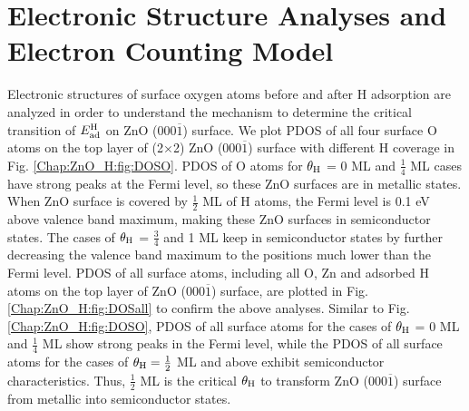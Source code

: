 \section{Electronic Structure Analyses and Electron Counting Model}

Electronic structures of surface oxygen atoms before and after H adsorption are analyzed in order to understand the mechanism to determine the critical transition of $E_{\textup{ad}}^{\textup{H}}$ on ZnO (000$\overline{1}$) surface. We plot \ac{PDOS} of all four surface O atoms on the top layer of (2$\times$2) ZnO (000$\overline{1}$) surface with different H coverage in Fig. \ref{Chap:ZnO_H:fig:DOSO}. \ac{PDOS} of O atoms for $\theta_{\textup{H}}$ = 0 ML and $\frac{1}{4}$ ML cases have strong peaks at the Fermi level, so these ZnO surfaces are in metallic states. When ZnO surface is covered by $\frac{1}{2}$ ML of H atoms, the Fermi level is 0.1 eV above valence band maximum, making these ZnO surfaces in semiconductor states. The cases of  $\theta_{\textup{H}}$ = $\frac{3}{4}$ and 1 ML keep in semiconductor states by further decreasing the valence band maximum to the positions much lower than the Fermi level. \ac{PDOS} of all surface atoms, including all O, Zn and adsorbed H atoms on the top layer of ZnO (000$\overline{1}$) surface, are plotted in Fig. \ref{Chap:ZnO_H:fig:DOSall} to confirm the above analyses. Similar to Fig. \ref{Chap:ZnO_H:fig:DOSO},  \ac{PDOS} of all surface atoms for the cases of $\theta_{\textup{H}}$ =  0 ML and $\frac{1}{4}$ ML show strong peaks in the Fermi level, while the \ac{PDOS} of all surface atoms for the cases of $\theta_{\textup{H}}=\frac{1}{2}$ ML and above exhibit semiconductor characteristics. Thus,  $\frac{1}{2}$ ML is the critical $\theta_{\textup{H}}$ to transform  ZnO (000$\overline{1}$) surface from metallic into semiconductor states. 

